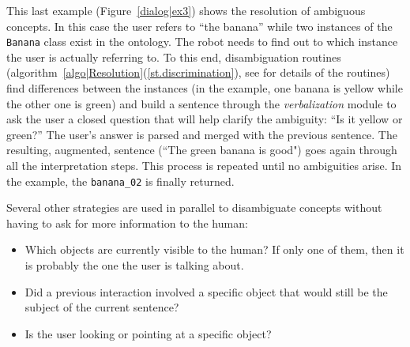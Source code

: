 \documentclass[twocolumn]{svjour3}
\newcommand{\concept}[1]{{\footnotesize \texttt{#1}}}
\begin{document}
This last example (Figure~\ref{dialog|ex3}) shows the resolution of ambiguous
concepts. In this case the user refers to ``the banana'' while two instances of 
the \concept{Banana} class exist in the ontology. The robot needs to find out
to which instance the user is actually referring to. To this end,
disambiguation routines (algorithm~\ref{algo|Resolution}(\ref{st.discrimination}), see \cite{Ros2010b} for details of the routines)
find differences between the instances (in the example, one banana is yellow
while the other one is green) and build a sentence through the
\emph{verbalization} module to ask the user a closed question that will
help clarify the ambiguity: ``Is it yellow or green?'' The user's answer is
parsed and merged with the previous sentence. The resulting, augmented,
sentence (``The green banana is good") goes again through all the
interpretation steps. This process is repeated until no ambiguities arise. 
In the example, the \concept{banana\_02} is finally returned.


Several other strategies are used in parallel to disambiguate concepts without
having to ask for more information to the human:

\begin{itemize}
	\item Which objects are currently visible to the human? If only one of
	them, then it is probably the one the user is talking about. 
	\item Did a previous interaction involved a specific object that would
	still be the subject of the current sentence?
	\item Is the user looking or pointing at a specific object?
\end{itemize}

\end{document}
